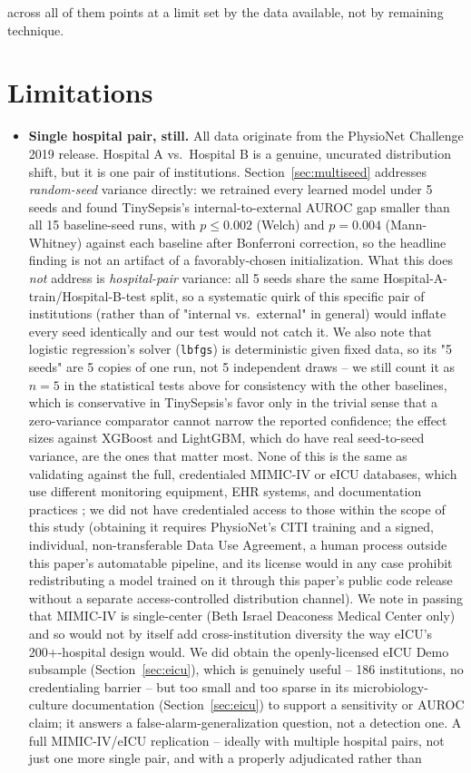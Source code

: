 \documentclass[11pt]{article}
\begin{document}
across all of them points at a limit set by the data available, not by remaining technique.

\section{Limitations}
\label{sec:limitations}

\begin{itemize}[leftmargin=*]
    \item \textbf{Single hospital pair, still.} All data originate from the PhysioNet Challenge 2019 release. Hospital A vs.\ Hospital B is a genuine, uncurated distribution shift, but it is one pair of institutions. Section~\ref{sec:multiseed} addresses \emph{random-seed} variance directly: we retrained every learned model under 5 seeds and found TinySepsis's internal-to-external AUROC gap smaller than all 15 baseline-seed runs, with $p\le0.002$ (Welch) and $p=0.004$ (Mann-Whitney) against each baseline after Bonferroni correction, so the headline finding is not an artifact of a favorably-chosen initialization. What this does \emph{not} address is \emph{hospital-pair} variance: all 5 seeds share the same Hospital-A-train/Hospital-B-test split, so a systematic quirk of this specific pair of institutions (rather than of "internal vs.\ external" in general) would inflate every seed identically and our test would not catch it. We also note that logistic regression's solver (\texttt{lbfgs}) is deterministic given fixed data, so its "5 seeds" are 5 copies of one run, not 5 independent draws -- we still count it as $n=5$ in the statistical tests above for consistency with the other baselines, which is conservative in TinySepsis's favor only in the trivial sense that a zero-variance comparator cannot narrow the reported confidence; the effect sizes against XGBoost and LightGBM, which do have real seed-to-seed variance, are the ones that matter most. None of this is the same as validating against the full, credentialed MIMIC-IV or eICU databases, which use different monitoring equipment, EHR systems, and documentation practices \citep{johnson2023mimiciv, pollard2018eicu}; we did not have credentialed access to those within the scope of this study (obtaining it requires PhysioNet's CITI training and a signed, individual, non-transferable Data Use Agreement, a human process outside this paper's automatable pipeline, and its license would in any case prohibit redistributing a model trained on it through this paper's public code release without a separate access-controlled distribution channel). We note in passing that MIMIC-IV is single-center (Beth Israel Deaconess Medical Center only) and so would not by itself add cross-institution diversity the way eICU's 200+-hospital design would. We did obtain the openly-licensed eICU Demo subsample (Section~\ref{sec:eicu}), which is genuinely useful -- 186 institutions, no credentialing barrier -- but too small and too sparse in its microbiology-culture documentation (Section~\ref{sec:eicu}) to support a sensitivity or AUROC claim; it answers a false-alarm-generalization question, not a detection one. A full MIMIC-IV/eICU replication -- ideally with multiple hospital pairs, not just one more single pair, and with a properly adjudicated rather than 
\end{itemize}
\end{document}
